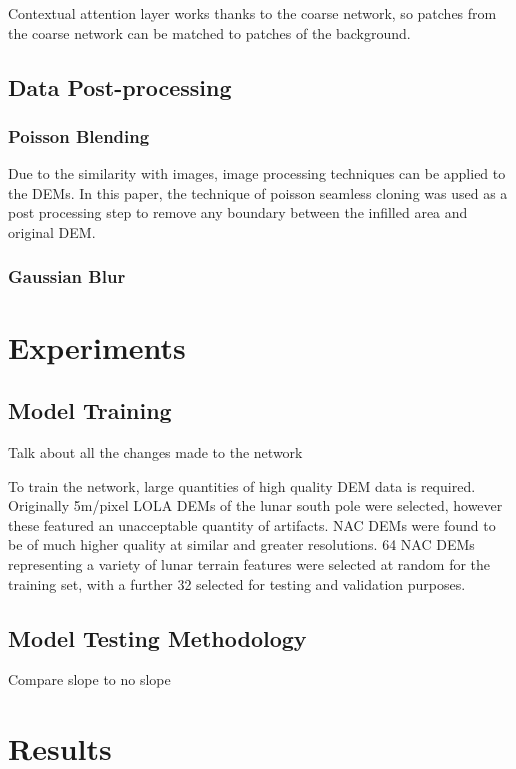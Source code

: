 \documentclass[twocolumn]{article}
\begin{document}
Contextual attention layer works thanks to the coarse network, so patches from the coarse network can be matched to patches of the background.

\subsection{Data Post-processing}
\label{sec:org10c09e2}
\subsubsection{Poisson Blending}
\label{sec:org3aad263}
Due to the similarity with images, image processing techniques can be applied to the DEMs.
In this paper, the technique of poisson seamless cloning\autocite{perezPoissonImageEditing2003} was used as a post processing step to remove any boundary between the infilled area and original DEM.

\subsubsection{Gaussian Blur}
\label{sec:org406bed6}


\section{Experiments}
\label{sec:org8040e38}
\subsection{Model Training}
\label{sec:orga493bcd}
Talk about all the changes made to the network

To train the network, large quantities of high quality DEM data is required.
Originally 5m/pixel LOLA DEMs of the lunar south pole were selected, however these featured an unacceptable quantity of artifacts.
NAC DEMs were found to be of much higher quality at similar and greater resolutions.
64 NAC DEMs\autocite{LROCRDRProduct} representing a variety of lunar terrain features were selected at random for the training set, with a further 32 selected for testing and validation purposes.
\subsection{Model Testing Methodology}
\label{sec:orgc3830a6}


Compare slope to no slope

\section{Results}
\label{sec:orgfd1f6c5}
\end{document}
